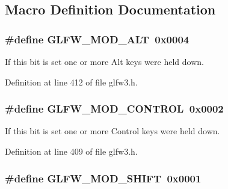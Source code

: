 \subsection{Macro Definition Documentation}
\hypertarget{group__mods_gad2acd5633463c29e07008687ea73c0f4}{
\subsubsection[{G\-L\-F\-W\-\_\-\-M\-O\-D\-\_\-\-A\-L\-T}]{\setlength{\rightskip}{0pt plus 5cm}\#define G\-L\-F\-W\-\_\-\-M\-O\-D\-\_\-\-A\-L\-T~0x0004}}\label{group__mods_gad2acd5633463c29e07008687ea73c0f4}


If this bit is set one or more Alt keys were held down. 



Definition at line 412 of file glfw3.\-h.

\hypertarget{group__mods_ga6ed94871c3208eefd85713fa929d45aa}{
\subsubsection[{G\-L\-F\-W\-\_\-\-M\-O\-D\-\_\-\-C\-O\-N\-T\-R\-O\-L}]{\setlength{\rightskip}{0pt plus 5cm}\#define G\-L\-F\-W\-\_\-\-M\-O\-D\-\_\-\-C\-O\-N\-T\-R\-O\-L~0x0002}}\label{group__mods_ga6ed94871c3208eefd85713fa929d45aa}


If this bit is set one or more Control keys were held down. 



Definition at line 409 of file glfw3.\-h.

\hypertarget{group__mods_ga14994d3196c290aaa347248e51740274}{
\subsubsection[{G\-L\-F\-W\-\_\-\-M\-O\-D\-\_\-\-S\-H\-I\-F\-T}]{\setlength{\rightskip}{0pt plus 5cm}\#define G\-L\-F\-W\-\_\-\-M\-O\-D\-\_\-\-S\-H\-I\-F\-T~0x0001}}\label{group__mods_ga14994d3196c290aaa347248e51740274}


